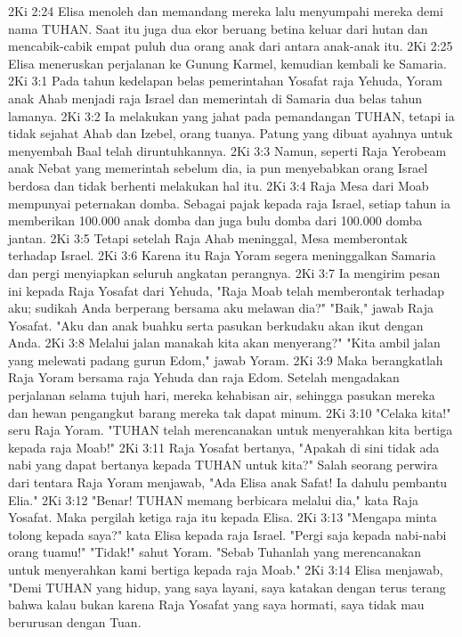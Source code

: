 2Ki 2:24  Elisa menoleh dan memandang mereka lalu menyumpahi mereka demi nama TUHAN. Saat itu juga dua ekor beruang betina keluar dari hutan dan mencabik-cabik empat puluh dua orang anak dari antara anak-anak itu.
2Ki 2:25  Elisa meneruskan perjalanan ke Gunung Karmel, kemudian kembali ke Samaria.
2Ki 3:1  Pada tahun kedelapan belas pemerintahan Yosafat raja Yehuda, Yoram anak Ahab menjadi raja Israel dan memerintah di Samaria dua belas tahun lamanya.
2Ki 3:2  Ia melakukan yang jahat pada pemandangan TUHAN, tetapi ia tidak sejahat Ahab dan Izebel, orang tuanya. Patung yang dibuat ayahnya untuk menyembah Baal telah diruntuhkannya.
2Ki 3:3  Namun, seperti Raja Yerobeam anak Nebat yang memerintah sebelum dia, ia pun menyebabkan orang Israel berdosa dan tidak berhenti melakukan hal itu.
2Ki 3:4  Raja Mesa dari Moab mempunyai peternakan domba. Sebagai pajak kepada raja Israel, setiap tahun ia memberikan 100.000 anak domba dan juga bulu domba dari 100.000 domba jantan.
2Ki 3:5  Tetapi setelah Raja Ahab meninggal, Mesa memberontak terhadap Israel.
2Ki 3:6  Karena itu Raja Yoram segera meninggalkan Samaria dan pergi menyiapkan seluruh angkatan perangnya.
2Ki 3:7  Ia mengirim pesan ini kepada Raja Yosafat dari Yehuda, "Raja Moab telah memberontak terhadap aku; sudikah Anda berperang bersama aku melawan dia?" "Baik," jawab Raja Yosafat. "Aku dan anak buahku serta pasukan berkudaku akan ikut dengan Anda.
2Ki 3:8  Melalui jalan manakah kita akan menyerang?" "Kita ambil jalan yang melewati padang gurun Edom," jawab Yoram.
2Ki 3:9  Maka berangkatlah Raja Yoram bersama raja Yehuda dan raja Edom. Setelah mengadakan perjalanan selama tujuh hari, mereka kehabisan air, sehingga pasukan mereka dan hewan pengangkut barang mereka tak dapat minum.
2Ki 3:10  "Celaka kita!" seru Raja Yoram. "TUHAN telah merencanakan untuk menyerahkan kita bertiga kepada raja Moab!"
2Ki 3:11  Raja Yosafat bertanya, "Apakah di sini tidak ada nabi yang dapat bertanya kepada TUHAN untuk kita?" Salah seorang perwira dari tentara Raja Yoram menjawab, "Ada Elisa anak Safat! Ia dahulu pembantu Elia."
2Ki 3:12  "Benar! TUHAN memang berbicara melalui dia," kata Raja Yosafat. Maka pergilah ketiga raja itu kepada Elisa.
2Ki 3:13  "Mengapa minta tolong kepada saya?" kata Elisa kepada raja Israel. "Pergi saja kepada nabi-nabi orang tuamu!" "Tidak!" sahut Yoram. "Sebab Tuhanlah yang merencanakan untuk menyerahkan kami bertiga kepada raja Moab."
2Ki 3:14  Elisa menjawab, "Demi TUHAN yang hidup, yang saya layani, saya katakan dengan terus terang bahwa kalau bukan karena Raja Yosafat yang saya hormati, saya tidak mau berurusan dengan Tuan.

